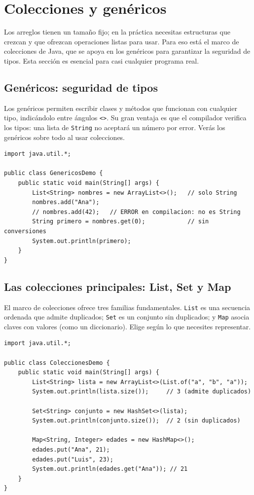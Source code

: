 \documentclass[11pt]{article}
\begin{document}
\section{Colecciones y genéricos}
Los arreglos tienen un tamaño fijo; en la práctica necesitas estructuras que crezcan y que ofrezcan operaciones listas para usar. Para eso está el marco de colecciones de Java, que se apoya en los genéricos para garantizar la seguridad de tipos. Esta sección es esencial para casi cualquier programa real.

\subsection{Genéricos: seguridad de tipos}
Los genéricos permiten escribir clases y métodos que funcionan con cualquier tipo, indicándolo entre ángulos \texttt{\textless{}\textgreater{}}. Su gran ventaja es que el compilador verifica los tipos: una lista de \texttt{String} no aceptará un número por error. Verás los genéricos sobre todo al usar colecciones.

\begin{cajacodigo}
\begin{lstlisting}[style=java]
import java.util.*;

public class GenericosDemo {
    public static void main(String[] args) {
        List<String> nombres = new ArrayList<>();   // solo String
        nombres.add("Ana");
        // nombres.add(42);   // ERROR en compilacion: no es String
        String primero = nombres.get(0);            // sin conversiones
        System.out.println(primero);
    }
}
\end{lstlisting}
\end{cajacodigo}
\vspace{2pt}
\subsection{Las colecciones principales: List, Set y Map}
El marco de colecciones ofrece tres familias fundamentales. \texttt{List} es una secuencia ordenada que admite duplicados; \texttt{Set} es un conjunto sin duplicados; y \texttt{Map} asocia claves con valores (como un diccionario). Elige según lo que necesites representar.

\begin{cajacodigo}
\begin{lstlisting}[style=java]
import java.util.*;

public class ColeccionesDemo {
    public static void main(String[] args) {
        List<String> lista = new ArrayList<>(List.of("a", "b", "a"));
        System.out.println(lista.size());     // 3 (admite duplicados)

        Set<String> conjunto = new HashSet<>(lista);
        System.out.println(conjunto.size());  // 2 (sin duplicados)

        Map<String, Integer> edades = new HashMap<>();
        edades.put("Ana", 21);
        edades.put("Luis", 23);
        System.out.println(edades.get("Ana")); // 21
    }
}
\end{lstlisting}
\end{cajacodigo}
\vspace{2pt}
\end{document}
